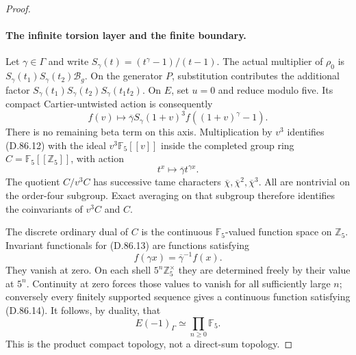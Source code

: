 \begin{proof}
\paragraph{The infinite torsion layer and the finite boundary.}
Let \(\gamma\in\Gamma\) and write
\(S_\gamma(t)=(t^\gamma-1)/(t-1)\). The actual multiplier
of \(\rho_0\) is
\(S_\gamma(t_1)S_\gamma(t_2)\mathcal B_g\).
On the generator \(P\), substitution contributes the additional
factor
\(S_\gamma(t_1)S_\gamma(t_2)S_\gamma(t_1t_2)\).
On \(E\), set \(u=0\) and reduce modulo five. Its compact
Cartier-untwisted action is consequently
\[
        f(v)\longmapsto
        \overline\gamma S_\gamma(1+v)^3
                   f((1+v)^\gamma-1).                \tag{D.86.12}
\]
There is no remaining beta term on this axis. Multiplication
by \(v^3\) identifies (D.86.12) with the ideal
\(v^3\mathbb F_5[[v]]\) inside the completed group ring
\(C=\mathbb F_5[[\mathbb Z_5]]\), with action
\[
                    t^x\longmapsto
                       \overline\gamma t^{\gamma x}.  \tag{D.86.13}
\]
The quotient \(C/v^3C\) has successive tame characters
\(\overline\chi,\overline\chi^2,\overline\chi^3\).
All are nontrivial on the order-four subgroup. Exact averaging
on that subgroup therefore identifies the coinvariants of
\(v^3C\) and \(C\).

The discrete ordinary dual of \(C\) is the continuous
\(\mathbb F_5\)-valued function space on \(\mathbb Z_5\).
Invariant functionals for (D.86.13) are functions satisfying
\[
 f(\gamma x)=\overline\gamma^{-1}f(x).
                                                               \tag{D.86.14}
\]
They vanish at zero. On each shell \(5^n\mathbb Z_5^\times\)
they are determined freely by their value at \(5^n\).
Continuity at zero forces those values to vanish for all
sufficiently large \(n\); conversely every finitely supported
sequence gives a continuous function satisfying (D.86.14).
It follows, by duality, that
\[
                         E(-1)_\Gamma
                               \simeq\prod_{n\ge0}\mathbb F_5.
                                                               \tag{D.86.15}
\]
This is the product compact topology, not a direct-sum topology.


\end{proof}
